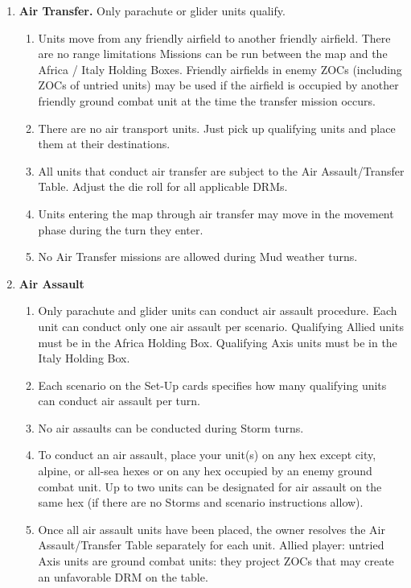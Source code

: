 \begin{enumerate}[label=\alph*.]
    \item \textbf{Air Transfer.} Only parachute or glider units qualify.
    \begin{enumerate}[label=\arabic*)]
        \item Units move from any friendly airfield to another friendly airfield. There are no range limitations Missions can be run between the map and the Africa / Italy Holding Boxes. Friendly airfields in enemy ZOCs (including ZOCs of untried units) may be used if the airfield is occupied by another friendly ground combat unit at the time the transfer mission occurs.
        \item There are no air transport units. Just pick up qualifying units and place them at their destinations.
        \item All units that conduct air transfer are subject to the Air Assault/Transfer Table. Adjust the die roll for all applicable DRMs.
        \item Units entering the map through air transfer may move in the movement phase during the turn they enter.
        \item No Air Transfer missions are allowed during Mud weather turns.
    \end{enumerate}
    \item \textbf{Air Assault}
    \begin{enumerate}[label=\arabic*)]
        \item Only parachute and glider units can conduct air assault procedure. Each unit can conduct only one air assault per scenario. Qualifying Allied units must be in the Africa Holding Box. Qualifying Axis units must be in the Italy Holding Box.
        \item Each scenario on the Set-Up cards specifies how many qualifying units can conduct air assault per turn.
        \item No air assaults can be conducted during Storm turns.
        \item To conduct an air assault, place your unit(s) on any hex except city, alpine, or all-sea hexes or on any hex occupied by an enemy ground combat unit. Up to two units can be designated for air assault on the same hex (if there are no Storms and scenario instructions allow).
        \item Once all air assault units have been placed, the owner resolves the Air Assault/Transfer Table separately for each unit. Allied player: untried Axis units are ground combat units: they project ZOCs that may create an unfavorable DRM on the table.

\end{enumerate}
\end{enumerate}
